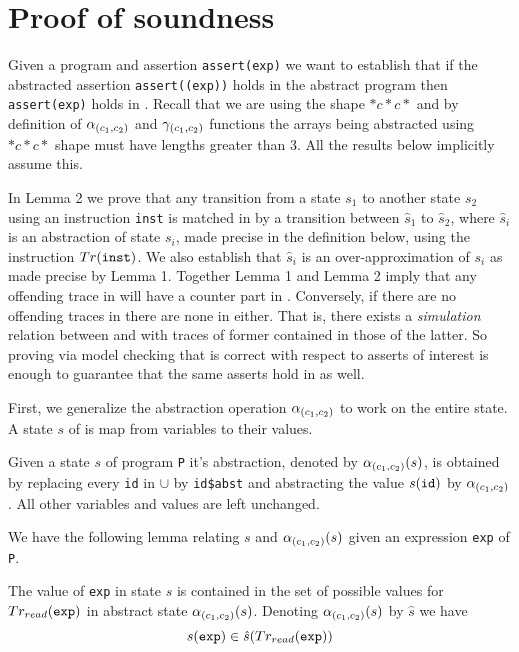 \section{ Proof of soundness}

Given a program \prog{} and assertion {\tt assert(exp)} we want to
establish that if the abstracted assertion {\tt assert(\trrd(exp))}
holds in the abstract program \progabst{} then {\tt assert(exp)} holds
in \prog. Recall that we are using the shape \(*c*c*\) and by
definition of \(\alpha_{(c_1,c_2)}\) and \(\gamma_{(c_1,c_2)}\) functions the arrays being
abstracted using \(*c*c*\) shape must have lengths greater than 3. All
the results below implicitly assume this.

In Lemma 2 we prove that any transition from a state \(s_1\)
to another state \(s_2\) using an instruction {\tt inst} is matched in
\progabst{} by a transition between \(\hat{s}_1\) to \(\hat{s}_2\),
where \(\hat{s}_i\) is an abstraction of state \(s_i\), made precise
in the definition below, using the instruction \(Tr({\tt
  inst})\). We also establish that \(\hat{s}_i\) is an
over-approximation of \(s_i\) as made precise by Lemma 1. Together
Lemma 1 and Lemma 2 imply that any offending trace in \prog{} will
have a counter part in \progabst{}. Conversely, if there are no
offending traces in \progabst{} there are none in \prog{} either. That
is, there exists a \emph{simulation} relation between \prog{} and
\progabst with traces of former contained in those of the latter. So
proving via model checking that \progabst{} is correct with respect to
asserts of interest is enough to guarantee that the same asserts hold in
\prog{} as well.

First, we
generalize the abstraction operation \(\alpha_{(c_1,c_2)}\) to work on the entire
state. A state \(s\) of \prog{} is map from variables to their values.

\begin{definition}
Given a state \(s\) of program {\tt P} it's abstraction, denoted by
\(\alpha_{(c_1,c_2)}(s)\), is obtained by replacing every {\tt id} in \arrayids{}
\(\cup\) \indexids{} by {\tt id\$abst} and abstracting the value \(s({\tt
  id})\) by \(\alpha_{(c_1,c_2)}\). All other variables and values are left
unchanged.
\end{definition}



We have the following lemma relating \(s\) and \(\alpha_{(c_1,c_2)}(s)\) given an
expression {\tt exp} of {\tt P}.

\begin{lemma}

The value of {\tt exp} in state \(s\) is contained in the set of
possible values for \(Tr_{read}({\tt exp})\) in abstract state
\(\alpha_{(c_1,c_2)}(s)\). Denoting \(\alpha_{(c_1,c_2)}(s)\) by \(\hat{s}\) we have \[s({\tt exp}) \in \hat{s}(Tr_{read}({\tt exp}))\]
  
\end{lemma}

